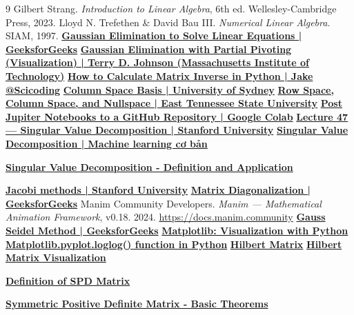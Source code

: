 \documentclass[a4paper]{article}
\begin{document}
\newpage
\begin{thebibliography}{9}
Gilbert Strang. \textit{Introduction to Linear Algebra}, 6th ed. Wellesley-Cambridge Press, 2023.
Lloyd N. Trefethen \& David Bau III. \textit{Numerical Linear Algebra}. SIAM, 1997.
\href{https://www.geeksforgeeks.org/dsa/gaussian-elimination/}{\textbf{Gaussian Elimination to Solve Linear Equations | GeeksforGeeks}}
\href{https://web.mit.edu/10.001/Web/Course_Notes/GaussElimPivoting.html}{\textbf{Gaussian Elimination with Partial Pivoting (Visualization) | Terry D. Johnson (Massachusetts Institute of Technology)}}
\href{https://scicoding.com/how-to-calculate-matrix-inverse-in-python/}{\textbf{How to Calculate Matrix Inverse in Python | Jake @Scicoding}}
\href{https://www.maths.usyd.edu.au/u/geoffp/lm-ss/lectp11.pdf}{\textbf{Column Space Basis | University of Sydney}}
\href{https://faculty.etsu.edu/joynerm/documents/RowSpaceColumnSpace.pdf}{\textbf{Row Space, Column Space, and Nullspace | East Tennessee State University}}
\href{https://www.youtube.com/watch?v=uBY06NpnLcs&t=5s}{\textbf{Post Jupiter Notebooks to a GitHub Repository | Google Colab}}
\href{https://www.youtube.com/watch?v=P5mlg91as1c}{\textbf{Lecture 47 — Singular Value Decomposition | Stanford University}}
\href{https://machinelearningcoban.com/2017/06/07/svd/}{\textbf{Singular Value Decomposition | Machine learning cơ bản}}

\href{https://machinelearningcoban.com/2017/06/07/svd/}{\textbf{Singular Value Decomposition - Definition and Application}}

\href{https://web.stanford.edu/class/cme335/lecture7.pdf}{\textbf{Jacobi methods | Stanford University}}
\href{https://www.geeksforgeeks.org/dsa/matrix-diagonalization/}{\textbf{Matrix Diagonalization | GeeksforGeeks}}
Manim Community Developers. \textit{Manim — Mathematical Animation Framework}, v0.18. 2024. \url{https://docs.manim.community}
\href{https://www.geeksforgeeks.org/python/gauss-seidel-method/}{\textbf{Gauss Seidel Method | GeeksforGeeks}}
\href{https://matplotlib.org/}{\textbf{Matplotlib: Visualization with Python}}
\href{https://www.geeksforgeeks.org/python/matplotlib-pyplot-loglog-function-in-python/}{\textbf{Matplotlib.pyplot.loglog() function in Python}}
\href{https://en.wikipedia.org/wiki/Hilbert_matrix}{\textbf{Hilbert Matrix}}
\href{https://medium.com/geekculture/visualize-hilbert-matrix-in-python-65955b63b115}{\textbf{Hilbert Matrix Visualization}}

\href{https://nhigham.com/2020/07/21/what-is-a-symmetric-positive-definite-matrix/}{\textbf{Definition of SPD Matrix}}

\href{https://www.youtube.com/watch?v=cjDf9JdA368}{\textbf{Symmetric Positive Definite Matrix - Basic Theorems}}
\end{thebibliography}
\end{document}

